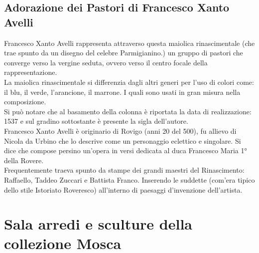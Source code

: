 \documentclass[12pt,a4paper]{article}
\begin{document}
	\subsection{Adorazione dei Pastori di Francesco Xanto Avelli}
	Francesco Xanto Avelli rappresenta attraverso questa maiolica rinascimentale (che trae spunto da un disegno del celebre Parmigianino.) un gruppo di pastori che converge verso la vergine seduta, ovvero verso il centro focale della rappresentazione.\\
	La maiolica rinascimentale si differenzia dagli altri generi per l'uso di colori come: il blu, il verde, l’arancione, il marrone. I quali sono usati in gran misura nella composizione.\\
	Si può notare che al basamento della colonna è riportata la data di realizzazione: 1537 e sul gradino sottostante è presente la sigla dell'autore.\\
	Francesco Xanto Avelli è originario di Rovigo (anni 20 del 500), fu allievo di Nicola da Urbino che lo descrive come un personaggio eclettico e singolare. Si dice che compose persino un’opera in versi dedicata al duca Francesco Maria 1° della Rovere.\\
	Frequentemente traeva spunto da stampe dei grandi maestri del Rinascimento: Raffaello, Taddeo Zuccari e Battista Franco. Inserendo le suddette (com'era tipico dello stile Istoriato Roveresco) all'interno di paesaggi d'invenzione dell'artista.
	
	\section{Sala arredi e sculture della collezione Mosca}
	
	
\end{document}
